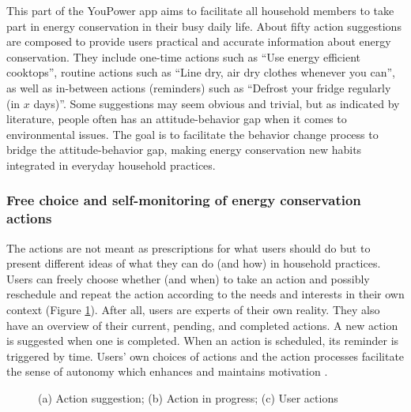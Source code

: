 This part of the YouPower app aims to %
facilitate all household members to take part in energy conservation in their busy daily life. 
% 
About fifty action suggestions are composed to provide users practical and accurate information about energy conservation. 
They include one-time actions such as ``Use energy efficient cooktops'', routine actions such as ``Line dry, air dry clothes whenever you can'', as well as in-between actions (reminders) such as ``Defrost your fridge regularly (in $x$ days)''. 
Some suggestions may seem obvious and trivial, but as indicated by literature, people often has an attitude-behavior gap when it comes to environmental issues. The goal is to facilitate the behavior change process to bridge the attitude-behavior gap, making energy conservation new habits integrated in everyday household practices. 

\subsubsection{Free choice and self-monitoring of energy conservation actions}
The actions are not meant as prescriptions for what users should do but to present different ideas of what they can do (and how) in household practices. 
Users can freely choose whether (and when) to take an action and possibly reschedule and repeat the action according to the needs and interests in their own context (Figure \ref{fig:actions}). After all, users are experts of their own reality. They also have an overview of their current, pending, and completed actions.
A new action is suggested when one is completed. %
When an action is scheduled, its reminder is triggered by time. Users' own choices of actions and the action processes facilitate the sense of autonomy which enhances and maintains motivation \cite{Ryan2000}. 

\begin{figure}[b!]
      \begin{center}
        \begin{minipage}[t!]{0.33\linewidth}
        \end{minipage}
        \begin{minipage}[t!]{0.31\linewidth}
                \end{minipage}
        \begin{minipage}[t!]{0.33\linewidth}    
        \end{minipage}
      \end{center}
      \caption{(a) Action suggestion; (b) Action in progress; (c) User actions}\label{fig:actions}
\end{figure}


